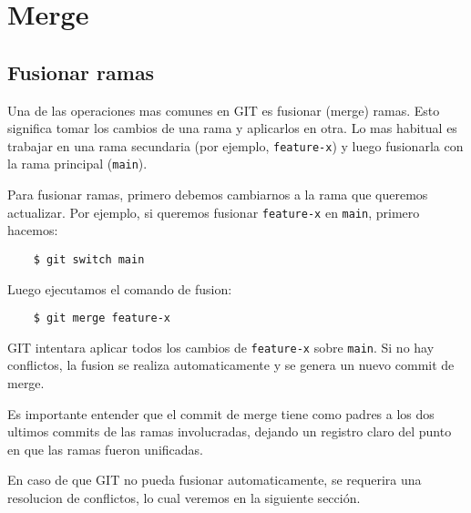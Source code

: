\section{Merge}

    \subsection{Fusionar ramas}
        Una de las operaciones mas comunes en GIT es fusionar (merge) ramas. Esto significa tomar los cambios de una rama y aplicarlos en otra. Lo mas habitual es trabajar en una rama secundaria (por ejemplo, \texttt{feature-x}) y luego fusionarla con la rama principal (\texttt{main}).

        Para fusionar ramas, primero debemos cambiarnos a la rama que queremos actualizar. Por ejemplo, si queremos fusionar \texttt{feature-x} en \texttt{main}, primero hacemos:

        \begin{lstlisting}
    $ git switch main
        \end{lstlisting}

        Luego ejecutamos el comando de fusion:

        \begin{lstlisting}
    $ git merge feature-x
        \end{lstlisting}

        GIT intentara aplicar todos los cambios de \texttt{feature-x} sobre \texttt{main}. Si no hay conflictos, la fusion se realiza automaticamente y se genera un nuevo commit de merge.

        Es importante entender que el commit de merge tiene como padres a los dos ultimos commits de las ramas involucradas, dejando un registro claro del punto en que las ramas fueron unificadas.

        En caso de que GIT no pueda fusionar automaticamente, se requerira una resolucion de conflictos, lo cual veremos en la siguiente secci\'on.
